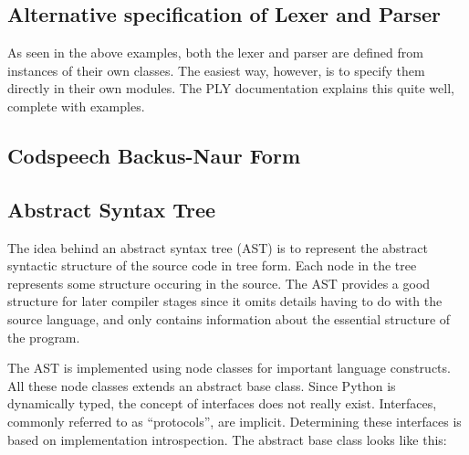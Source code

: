 \subsection{Alternative specification of Lexer and Parser}
As seen in the above examples, both the lexer and parser are defined
from instances of their own classes. The easiest way, however, is to
specify them directly in their own modules. The PLY documentation
explains this quite well, complete with examples. \citep{ply:online}


\subsection{Codspeech Backus-Naur Form}\label{sec:bnf}



\subsection{Abstract Syntax Tree}\label{sec:ast}
The idea behind an abstract syntax tree (AST) is to represent the
abstract syntactic structure of the source code in tree form. Each
node in the tree represents some structure occuring in the source. The
AST provides a good structure for later compiler stages since it omits
details having to do with the source language, and only contains
information about the essential structure of the program.

The AST is implemented using node classes for important language
constructs. All these node classes extends an abstract base
class. Since Python is dynamically typed, the concept of interfaces
does not really exist. Interfaces, commonly referred to as
``protocols'', are implicit. Determining these interfaces is based on
implementation introspection. The abstract base class looks like this:

